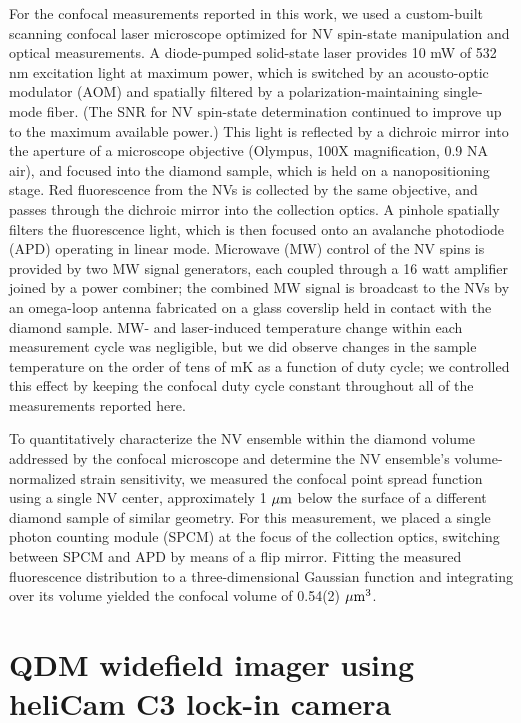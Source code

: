 \documentclass[reprint,superscriptaddress,hyphens,amsmath,amssymb,aps,prx,float]{revtex4-2}
\begin{document}
For the confocal measurements reported in this work, we used a custom-built scanning confocal laser microscope optimized for NV spin-state manipulation and optical measurements.  A diode-pumped solid-state laser provides 10 mW of 532 nm excitation light at maximum power, which is switched by an acousto-optic modulator (AOM) and spatially filtered by a polarization-maintaining single-mode fiber.  (The SNR for NV spin-state determination continued to improve up to the maximum available power.)   This light is reflected by a dichroic mirror into the aperture of a microscope objective (Olympus, 100X magnification, 0.9 NA air), and focused into the diamond sample, which is held on a nanopositioning stage.  Red fluorescence from the NVs is collected by the same objective, and passes through the dichroic mirror into the collection optics.  A pinhole spatially filters the fluorescence light, which is then focused onto an avalanche photodiode (APD) operating in linear mode.  Microwave (MW) control of the NV spins is provided by two MW signal generators, each coupled through a 16 watt amplifier joined by a power combiner; the combined MW signal is broadcast to the NVs by an omega-loop antenna fabricated on a glass coverslip held in contact with the diamond sample.  MW- and laser-induced temperature change within each measurement cycle was negligible, but we did observe changes in the sample temperature on the order of tens of mK as a function of duty cycle; we controlled this effect by keeping the confocal duty cycle constant throughout all of the measurements reported here.

To quantitatively characterize the NV ensemble within the diamond volume addressed by the confocal microscope and determine the NV ensemble's volume-normalized strain sensitivity, we measured the confocal point spread function using a single NV center, approximately 1 $\rm{\mu m}$ below the surface of a different diamond sample of similar geometry.  For this measurement, we placed a single photon counting module (SPCM) at the focus of the collection optics, switching between SPCM and APD by means of a flip mirror.  Fitting the measured fluorescence distribution to a three-dimensional Gaussian function and integrating over its volume yielded the confocal volume of 0.54(2) $\rm{\mu m^3}$.

\section{QDM widefield imager using heliCam C3 lock-in camera}
\label{sec:QDMapparatus}
\end{document}
